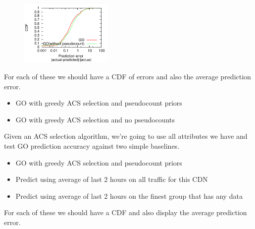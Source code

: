 \begin{figure}[h!]
\centering
 \includegraphics[width=0.4\textwidth] {figures/prediction-comparisons/example-pcount-metric1.pdf}
\label{fig:quality-variability}
\end{figure}

For each of these we should have a CDF of errors and also the average prediction error.
\begin{itemize}
	\item GO with greedy ACS selection and pseudocount priors
	\item GO with greedy ACS selection and no pseudocounts
\end{itemize}

Given an ACS selection algorithm, we’re going to use all attributes we have and test GO prediction accuracy against two simple baselines.
\begin{itemize}
	\item GO with greedy ACS selection and pseudocount priors
	\item Predict using average of last 2 hours on all traffic for this CDN
	\item Predict using average of last 2 hours on the finest group that has any data
\end{itemize}
For each of these we should have a CDF and also display the average prediction error.

